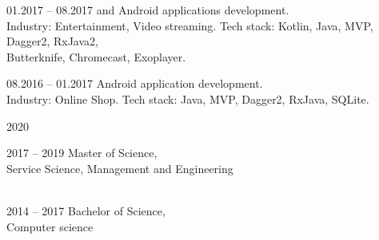 \documentclass[12pt, a4paper]{article}
\newcommand{\sectionSpace}{16pt}
\begin{document}
\begin{minipage}[t]{0.6\textwidth}
    \begin{subsec}{}{01.2017 – 08.2017}
        \>   and  Android applications development.   \\
        \>  Industry: Entertainment, Video streaming.               \lineend
        \>  Tech stack: Kotlin, Java, MVP, Dagger2, RxJava2,                                        \\
        \>  Butterknife, Chromecast, Exoplayer.                                                     \\
    \end{subsec}
    
    \begin{subsec}{}{08.2016 – 01.2017}
        \>   Android application development.    \\
        \>  Industry: Online Shop.                                      \lineend
        \>  Tech stack: Java, MVP, Dagger2, RxJava, SQLite.             \\
    \end{subsec}
    
    
    \vspace{\sectionSpace}
    
    \begin{subsec}{}{2020}
        \>  \\
    \end{subsec}
    
    \begin{subsec}{}{2017 – 2019}
        \> Master of Science,  \\
        \> Service Science, Management and Engineering \\
        \>  \\
    \end{subsec}
    
    \begin{subsec}{}{2014 – 2017}
        \> Bachelor of Science,  \\
        \> Computer science \\
    \end{subsec}
\end{minipage}
\end{document}
